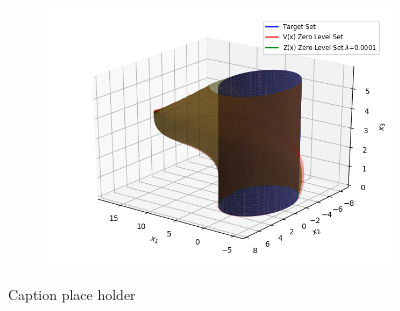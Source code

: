 \begin{figure}[t!]
\begin{subfigure}[t]{0.3\textwidth}
        \includegraphics[scale=0.4]{air_3d_v3}
        \caption{}
    \end{subfigure}%
    \caption{Caption place holder}
\end{figure}